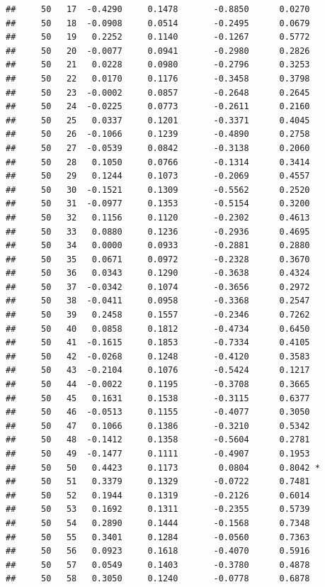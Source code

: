 \documentclass[
]{article}
\begin{document}
\begin{verbatim}
##     50   17  -0.4290     0.1478       -0.8850      0.0270  
##     50   18  -0.0908     0.0514       -0.2495      0.0679  
##     50   19   0.2252     0.1140       -0.1267      0.5772  
##     50   20  -0.0077     0.0941       -0.2980      0.2826  
##     50   21   0.0228     0.0980       -0.2796      0.3253  
##     50   22   0.0170     0.1176       -0.3458      0.3798  
##     50   23  -0.0002     0.0857       -0.2648      0.2645  
##     50   24  -0.0225     0.0773       -0.2611      0.2160  
##     50   25   0.0337     0.1201       -0.3371      0.4045  
##     50   26  -0.1066     0.1239       -0.4890      0.2758  
##     50   27  -0.0539     0.0842       -0.3138      0.2060  
##     50   28   0.1050     0.0766       -0.1314      0.3414  
##     50   29   0.1244     0.1073       -0.2069      0.4557  
##     50   30  -0.1521     0.1309       -0.5562      0.2520  
##     50   31  -0.0977     0.1353       -0.5154      0.3200  
##     50   32   0.1156     0.1120       -0.2302      0.4613  
##     50   33   0.0880     0.1236       -0.2936      0.4695  
##     50   34   0.0000     0.0933       -0.2881      0.2880  
##     50   35   0.0671     0.0972       -0.2328      0.3670  
##     50   36   0.0343     0.1290       -0.3638      0.4324  
##     50   37  -0.0342     0.1074       -0.3656      0.2972  
##     50   38  -0.0411     0.0958       -0.3368      0.2547  
##     50   39   0.2458     0.1557       -0.2346      0.7262  
##     50   40   0.0858     0.1812       -0.4734      0.6450  
##     50   41  -0.1615     0.1853       -0.7334      0.4105  
##     50   42  -0.0268     0.1248       -0.4120      0.3583  
##     50   43  -0.2104     0.1076       -0.5424      0.1217  
##     50   44  -0.0022     0.1195       -0.3708      0.3665  
##     50   45   0.1631     0.1538       -0.3115      0.6377  
##     50   46  -0.0513     0.1155       -0.4077      0.3050  
##     50   47   0.1066     0.1386       -0.3210      0.5342  
##     50   48  -0.1412     0.1358       -0.5604      0.2781  
##     50   49  -0.1477     0.1111       -0.4907      0.1953  
##     50   50   0.4423     0.1173        0.0804      0.8042 *
##     50   51   0.3379     0.1329       -0.0722      0.7481  
##     50   52   0.1944     0.1319       -0.2126      0.6014  
##     50   53   0.1692     0.1311       -0.2355      0.5739  
##     50   54   0.2890     0.1444       -0.1568      0.7348  
##     50   55   0.3401     0.1284       -0.0560      0.7363  
##     50   56   0.0923     0.1618       -0.4070      0.5916  
##     50   57   0.0549     0.1403       -0.3780      0.4878  
##     50   58   0.3050     0.1240       -0.0778      0.6878  

\end{verbatim}
\end{document}
